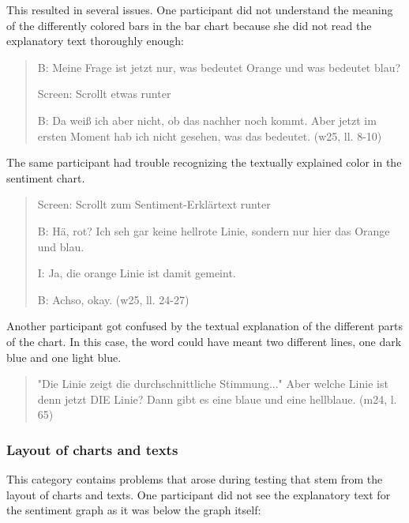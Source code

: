 
This resulted in several issues. One participant did not understand the meaning of the differently colored bars in the bar chart because she did not read the explanatory text thoroughly enough:

\begin{quote}
    B: Meine Frage ist jetzt nur, was bedeutet Orange und was bedeutet blau? 

    Screen: Scrollt etwas runter

    B: Da weiß ich aber nicht, ob das nachher noch kommt. Aber jetzt im ersten Moment hab ich nicht gesehen, was das bedeutet. (w25, ll. 8-10)
\end{quote}

The same participant had trouble recognizing the textually explained color in the sentiment chart.

\begin{quote}
    Screen: Scrollt zum Sentiment-Erklärtext runter

    B: Hä, rot? Ich seh gar keine hellrote Linie, sondern nur hier das Orange und blau.

    I: Ja, die orange Linie ist damit gemeint.

    B: Achso, okay. (w25, ll. 24-27)
\end{quote}

Another participant got confused by the textual explanation of the different parts of the chart. In this case, the word  could have meant two different lines, one dark blue and one light blue.

\begin{quote}
    "Die Linie zeigt die durchschnittliche Stimmung..." Aber welche Linie ist denn jetzt DIE Linie? Dann gibt es eine blaue und eine hellblaue. (m24, l. 65)
\end{quote}

\subsubsection*{Layout of charts and texts}
This category contains problems that arose during testing that stem from the layout of charts and texts. One participant did not see the explanatory text for the sentiment graph as it was below the graph itself:

